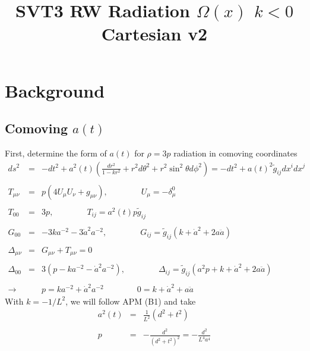 \documentclass[10pt,letterpaper]{article}
\title{SVT3 RW Radiation $\Omega(x)$ $k<0$ Cartesian v2}
\date{}
\numberwithin{equation}{section}
\begin{document}
 
\maketitle
\noindent 
\section{Background}

\subsection{Comoving $a(t)$}
First, determine the form of $a(t)$ for $\rho = 3p$ radiation in comoving coordinates
\begin{eqnarray}
ds^2 &=& -dt^2 + a^2(t)\left( \frac{dr^2}{1-kr^2} + r^2d\theta^2 + r^2\sin^2\theta d\phi^2\right) = -dt^2 + a(t)^2 \tilde g_{ij} dx^i dx^j
\\ \nonumber\\
T_{\mu\nu} &=& p(4U_\mu U_\nu + g_{\mu\nu}),\qquad\qquad U_\mu = -\delta^0_\mu
\\ \nonumber\\
T_{00} &=& 3p,\qquad\qquad T_{ij} = a^2(t)p \tilde g_{ij}
\\ \nonumber\\
G_{00} &=& -3k a^{-2} -3 \dot a^2 a^{-2},\qquad\qquad G_{ij} = \tilde g_{ij}(k + \dot a^2 + 2 a \ddot a)
\\ \nonumber\\
\Delta_{\mu\nu} &=& G_{\mu\nu}+ T_{\mu\nu} = 0
\\ \nonumber\\
\Delta_{00} &=& 3( p- ka^{-2} -\dot a^2 a^{-2}), \qquad\qquad
\Delta_{ij} = \tilde g_{ij}( a^2 p +k + \dot a^2 + 2a \ddot a)
\\ \nonumber\\
\to  &&\boxed{p= k a^{-2} + \dot a^2 a^{-2}}
\qquad\qquad \boxed{0= k + \dot a^2 + a\ddot a}
\end{eqnarray}
With $k=-1/L^2$, we will follow APM (B1) and take 
\begin{eqnarray}
a^2(t) &=& \frac{1}{L^2}(d^2+t^2)
\label{a(t)}
\\ \nonumber\\
p &=& -\frac{ d^2}{(d^2 + t^2)^2} = -\frac{d^2}{L^4a^4}
\end{eqnarray}

\end{document}
